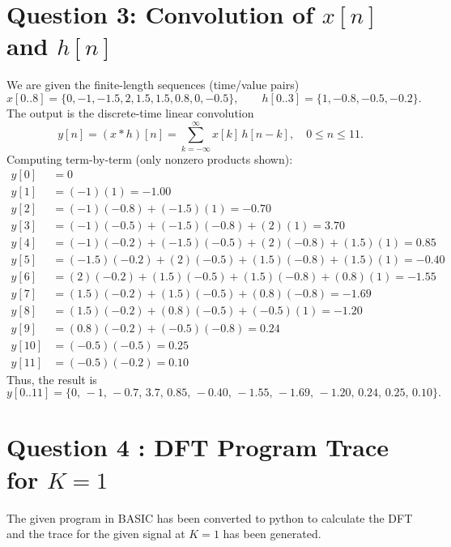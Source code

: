 \documentclass[a4paper,12pt]{article}
\begin{document}
\section{Question 3: Convolution of $x[n]$ and $h[n]$}
We are given the finite-length sequences (time/value pairs)
\[
x[0..8]=\{0,-1,-1.5,2,1.5,1.5,0.8,0,-0.5\},\qquad
h[0..3]=\{1,-0.8,-0.5,-0.2\}.
\]
The output is the discrete-time linear convolution
\[
y[n]=(x*h)[n]=\sum_{k=-\infty}^{\infty} x[k]\,h[n-k],\quad 0\le n\le 11.
\]
Computing term-by-term (only nonzero products shown):
\begin{align*}
y[0]  &= 0\\
y[1]  &= (-1)(1) = -1.00\\
y[2]  &= (-1)(-0.8) + (-1.5)(1) = -0.70\\
y[3]  &= (-1)(-0.5) + (-1.5)(-0.8) + (2)(1) = 3.70\\
y[4]  &= (-1)(-0.2) + (-1.5)(-0.5) + (2)(-0.8) + (1.5)(1) = 0.85\\
y[5]  &= (-1.5)(-0.2) + (2)(-0.5) + (1.5)(-0.8) + (1.5)(1) = -0.40\\
y[6]  &= (2)(-0.2) + (1.5)(-0.5) + (1.5)(-0.8) + (0.8)(1) = -1.55\\
y[7]  &= (1.5)(-0.2) + (1.5)(-0.5) + (0.8)(-0.8) = -1.69\\
y[8]  &= (1.5)(-0.2) + (0.8)(-0.5) + (-0.5)(1) = -1.20\\
y[9]  &= (0.8)(-0.2) + (-0.5)(-0.8) = 0.24\\
y[10] &= (-0.5)(-0.5) = 0.25\\
y[11] &= (-0.5)(-0.2) = 0.10
\end{align*}
Thus, the result is
\[
y[0..11]=\{0,\,-1,\,-0.7,\,3.7,\,0.85,\,-0.40,\,-1.55,\,-1.69,\,-1.20,\,0.24,\,0.25,\,0.10\}.
\]

\section{Question 4 : DFT Program Trace for $K=1$}

The given program in BASIC has been converted to python to calculate the DFT and the trace for the given signal at $K=1$ has been generated.
\end{document}
